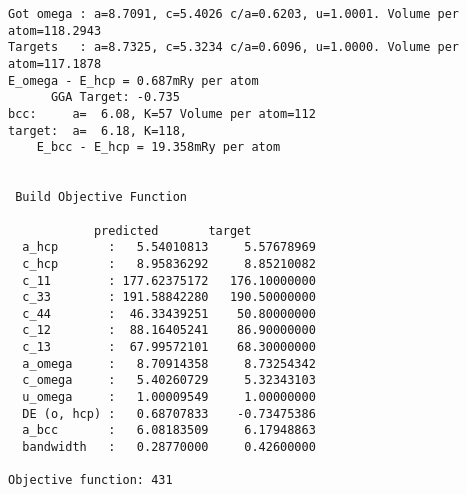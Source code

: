 \documentclass[11pt]{article}
\begin{document}
\begin{verbatim}
Got omega : a=8.7091, c=5.4026 c/a=0.6203, u=1.0001. Volume per atom=118.2943
Targets   : a=8.7325, c=5.3234 c/a=0.6096, u=1.0000. Volume per atom=117.1878
E_omega - E_hcp = 0.687mRy per atom 
      GGA Target: -0.735
bcc:     a=  6.08, K=57 Volume per atom=112
target:  a=  6.18, K=118,                     
	E_bcc - E_hcp = 19.358mRy per atom 


 Build Objective Function

		    predicted       target   
  a_hcp       :   5.54010813     5.57678969  
  c_hcp       :   8.95836292     8.85210082  
  c_11        : 177.62375172   176.10000000  
  c_33        : 191.58842280   190.50000000  
  c_44        :  46.33439251    50.80000000  
  c_12        :  88.16405241    86.90000000  
  c_13        :  67.99572101    68.30000000  
  a_omega     :   8.70914358     8.73254342  
  c_omega     :   5.40260729     5.32343103  
  u_omega     :   1.00009549     1.00000000  
  DE (o, hcp) :   0.68707833    -0.73475386  
  a_bcc       :   6.08183509     6.17948863  
  bandwidth   :   0.28770000     0.42600000  

Objective function: 431

\end{verbatim}
\end{document}
